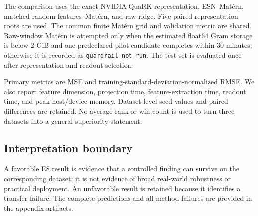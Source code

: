 The comparison uses the exact NVIDIA QuaRK representation, ESN--Mat\'ern,
matched random features--Mat\'ern, and raw ridge.  Five paired representation
roots are used.  The common finite Mat\'ern grid and validation metric are
shared.  Raw-window Mat\'ern is attempted only when the estimated float64 Gram
storage is below 2 GiB and one predeclared pilot candidate completes within 30
minutes; otherwise it is recorded as \texttt{guardrail-not-run}.  The test set
is evaluated once after representation and readout selection.

Primary metrics are MSE and training-standard-deviation-normalized RMSE.  We
also report feature dimension, projection time, feature-extraction time,
readout time, and peak host/device memory.  Dataset-level seed values and paired
differences are retained.  No average rank or win count is used to turn three
datasets into a general superiority statement.

\subsection{Interpretation boundary}
\label{app:real-world-interpretation}

A favorable E8 result is evidence that a controlled finding can survive on the
corresponding dataset; it is not evidence of broad real-world robustness or
practical deployment.  An unfavorable result is retained because it identifies
a transfer failure.  The complete predictions and all method failures are
provided in the appendix artifacts.
